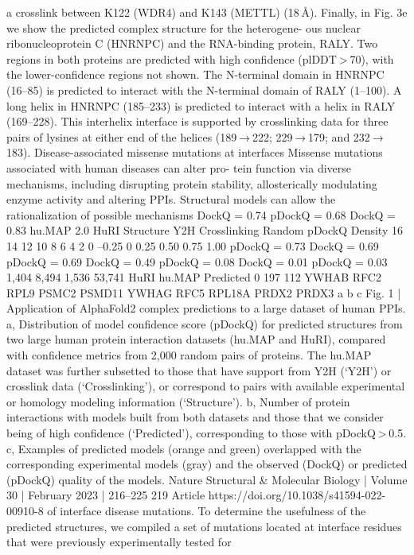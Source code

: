 a crosslink between K122 (WDR4) and K143 (METTL) (18 Å). Finally, in
Fig. 3e we show the predicted complex structure for the heterogene-
ous nuclear ribonucleoprotein C (HNRNPC) and the RNA-binding
protein, RALY. Two regions in both proteins are predicted with high
confidence (plDDT > 70), with the lower-confidence regions not shown.
The N-terminal domain in HNRNPC (16–85) is predicted to interact
with the N-terminal domain of RALY (1–100). A long helix in HNRNPC
(185–233) is predicted to interact with a helix in RALY (169–228). This
interhelix interface is supported by crosslinking data for three pairs of
lysines at either end of the helices (189 → 222; 229 → 179; and 232 → 183).
Disease-associated missense mutations at
interfaces
Missense mutations associated with human diseases can alter pro-
tein function via diverse mechanisms, including disrupting protein
stability, allosterically modulating enzyme activity and altering PPIs.
Structural models can allow the rationalization of possible mechanisms
DockQ = 0.74
pDockQ = 0.68
DockQ = 0.83
hu.MAP 2.0
HuRI
Structure
Y2H
Crosslinking
Random
pDockQ
Density
16
14
12
10
8
6
4
2
0
–0.25
0
0.25
0.50
0.75
1.00
pDockQ = 0.73
DockQ = 0.69
pDockQ = 0.69
DockQ = 0.49
pDockQ = 0.08
DockQ = 0.01
pDockQ = 0.03
1,404
8,494
1,536
53,741
HuRI
hu.MAP
Predicted
0
197
112
YWHAB
RFC2
RPL9
PSMC2
PSMD11
YWHAG
RFC5
RPL18A
PRDX2
PRDX3
a
b
c
Fig. 1 | Application of AlphaFold2 complex predictions to a large dataset of
human PPIs. a, Distribution of model confidence score (pDockQ) for predicted
structures from two large human protein interaction datasets (hu.MAP and
HuRI), compared with confidence metrics from 2,000 random pairs of proteins.
The hu.MAP dataset was further subsetted to those that have support from Y2H
(‘Y2H’) or crosslink data (‘Crosslinking’), or correspond to pairs with available
experimental or homology modeling information (‘Structure’). b, Number of
protein interactions with models built from both datasets and those that we
consider being of high confidence (‘Predicted’), corresponding to those with
pDockQ > 0.5. c, Examples of predicted models (orange and green) overlapped
with the corresponding experimental models (gray) and the observed (DockQ)
or predicted (pDockQ) quality of the models.
Nature Structural \& Molecular Biology | Volume 30 | February 2023 | 216–225
219
Article
https://doi.org/10.1038/s41594-022-00910-8
of interface disease mutations. To determine the usefulness of the
predicted structures, we compiled a set of mutations located at
interface residues that were previously experimentally tested for
